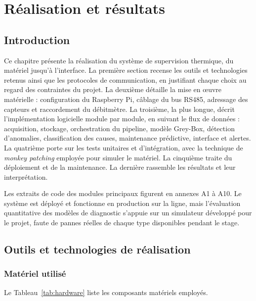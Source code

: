 \chapter{Réalisation et résultats}
\newpage
\section*{Introduction}

Ce chapitre présente la réalisation du système de supervision thermique, du matériel jusqu'à l'interface. La première section recense les outils et technologies retenus ainsi que les protocoles de communication, en justifiant chaque choix au regard des contraintes du projet. La deuxième détaille la mise en œuvre matérielle : configuration du Raspberry Pi, câblage du bus RS485, adressage des capteurs et raccordement du débitmètre. La troisième, la plus longue, décrit l'implémentation logicielle module par module, en suivant le flux de données : acquisition, stockage, orchestration du pipeline, modèle Grey-Box, détection d'anomalies, classification des causes, maintenance prédictive, interface et alertes. La quatrième porte sur les tests unitaires et d'intégration, avec la technique de \textit{monkey patching} employée pour simuler le matériel. La cinquième traite du déploiement et de la maintenance. La dernière rassemble les résultats et leur interprétation.

Les extraits de code des modules principaux figurent en annexes A1 à A10. Le système est déployé et fonctionne en production sur la ligne, mais l'évaluation quantitative des modèles de diagnostic s'appuie sur un simulateur développé pour le projet, faute de pannes réelles de chaque type disponibles pendant le stage.

\section{Outils et technologies de réalisation}

\subsection{Matériel utilisé}

Le Tableau~\ref{tab:hardware} liste les composants matériels employés.

